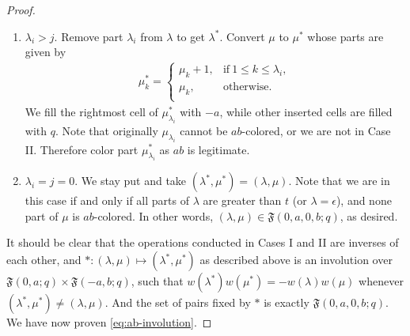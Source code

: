 \documentclass[12pt,reqno]{amsart}
\numberwithin{equation}{section}
\theoremstyle{plain}
\theoremstyle{definition}
\def\fF{\mathfrak{F}}
\begin{document}
\begin{proof}
\begin{enumerate}
\item[Case II] $\lambda_i>j$. Remove part $\lambda_i$ from $\lambda$ to get $\lambda^*$. Convert $\mu$ to
$\mu^*$ whose parts are given by
\begin{align*}
\mu^*_k=\begin{cases}
\mu_k+1, &\textrm{if}~1\le k\le \lambda_i,\\
\mu_k, &\textrm{otherwise.}\\
\end{cases}
\end{align*}
We fill the rightmost cell of $\mu^*_{\lambda_i}$ with $-a$, while other inserted cells are filled with $q$.
Note that originally $\mu_{\lambda_i}$ cannot be $ab$-colored, or we are not in Case II. Therefore color
part $\mu^*_{\lambda_i}$ as $ab$ is legitimate.

\item[Case III] $\lambda_i=j=0$. We stay put and take $(\lambda^*,\mu^*)=(\lambda,\mu)$. Note that we are in
this case if and only if all parts of $\lambda$ are greater than $t$ (or $\lambda=\epsilon$), and none part
of $\mu$ is $ab$-colored. In other words, $(\lambda,\mu)\in\fF(0,a,0,b;q)$, as desired.
\end{enumerate}
It should be clear that the operations conducted in Cases I and II are inverses of each other, and
$*:(\lambda,\mu)\mapsto(\lambda^*,\mu^*)$ as described above is an involution over
$\fF(0,a;q)\times\fF(-a,b;q)$, such that $w(\lambda^*)w(\mu^*)=-w(\lambda)w(\mu)$ whenever
$(\lambda^*,\mu^*)\neq(\lambda,\mu)$. And the set of pairs fixed by $*$ is exactly $\fF(0,a,0,b;q)$. We have
now proven \eqref{eq:ab-involution}.
\end{proof}
\end{document}
